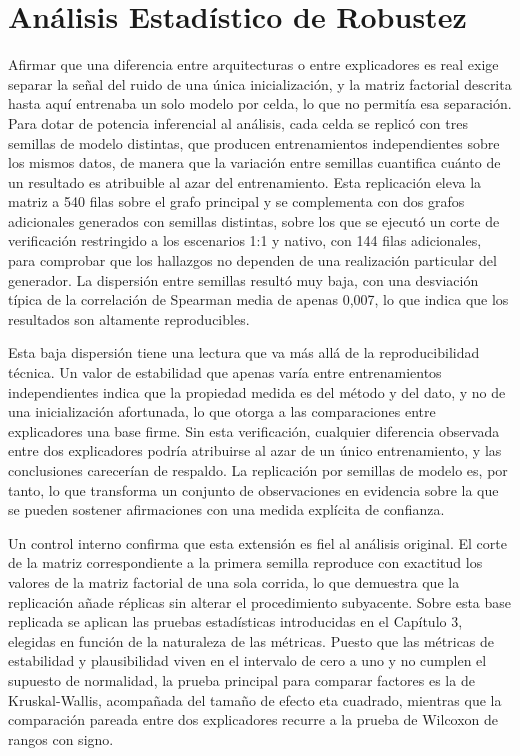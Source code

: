 \section{Análisis Estadístico de Robustez}

Afirmar que una diferencia entre arquitecturas o entre explicadores es real exige separar la señal del ruido de una única inicialización, y la matriz factorial descrita hasta aquí entrenaba un solo modelo por celda, lo que no permitía esa separación. Para dotar de potencia inferencial al análisis, cada celda se replicó con tres semillas de modelo distintas, que producen entrenamientos independientes sobre los mismos datos, de manera que la variación entre semillas cuantifica cuánto de un resultado es atribuible al azar del entrenamiento. Esta replicación eleva la matriz a 540 filas sobre el grafo principal y se complementa con dos grafos adicionales generados con semillas distintas, sobre los que se ejecutó un corte de verificación restringido a los escenarios 1:1 y nativo, con 144 filas adicionales, para comprobar que los hallazgos no dependen de una realización particular del generador. La dispersión entre semillas resultó muy baja, con una desviación típica de la correlación de Spearman media de apenas 0,007, lo que indica que los resultados son altamente reproducibles.

Esta baja dispersión tiene una lectura que va más allá de la reproducibilidad técnica. Un valor de estabilidad que apenas varía entre entrenamientos independientes indica que la propiedad medida es del método y del dato, y no de una inicialización afortunada, lo que otorga a las comparaciones entre explicadores una base firme. Sin esta verificación, cualquier diferencia observada entre dos explicadores podría atribuirse al azar de un único entrenamiento, y las conclusiones carecerían de respaldo. La replicación por semillas de modelo es, por tanto, lo que transforma un conjunto de observaciones en evidencia sobre la que se pueden sostener afirmaciones con una medida explícita de confianza.

Un control interno confirma que esta extensión es fiel al análisis original. El corte de la matriz correspondiente a la primera semilla reproduce con exactitud los valores de la matriz factorial de una sola corrida, lo que demuestra que la replicación añade réplicas sin alterar el procedimiento subyacente. Sobre esta base replicada se aplican las pruebas estadísticas introducidas en el Capítulo 3, elegidas en función de la naturaleza de las métricas. Puesto que las métricas de estabilidad y plausibilidad viven en el intervalo de cero a uno y no cumplen el supuesto de normalidad, la prueba principal para comparar factores es la de Kruskal-Wallis, acompañada del tamaño de efecto eta cuadrado, mientras que la comparación pareada entre dos explicadores recurre a la prueba de Wilcoxon de rangos con signo.

